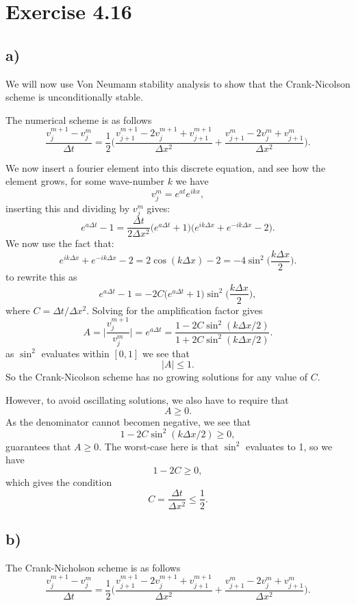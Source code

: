 \documentclass[a4paper, 11pt, notitlepage, english]{article}
\begin{document}
\clearpage

\section*{Exercise 4.16}

\subsection*{a)}
We will now use Von Neumann stability analysis to show that the Crank-Nicolson scheme is unconditionally stable.

The numerical scheme is as follows
$$\frac{v_j^{m+1} - v_j^m}{\Delta t} = \frac{1}{2}\bigg(\frac{v_{j+1}^{m+1} - 2v_j^{m+1} + v_{j+1}^{m+1}}{\Delta x^2} + \frac{v_{j+1}^{m} - 2v_j^{m} + v_{j+1}^{m}}{\Delta x^2} \bigg).$$

We now insert a fourier element into this discrete equation, and see how the element grows, for some wave-number $k$ we have 
$$v_j^m = e^{at}e^{ikx},$$
inserting this and dividing by $v_j^m$ gives:
$$e^{a\Delta t} - 1 = \frac{\Delta t}{2\Delta x^2}\big(e^{a\Delta t}+1\big)\big(e^{ik\Delta x} + e^{-ik\Delta x} - 2\big).$$
We now use the fact that:
$$e^{ik\Delta x} + e^{-ik\Delta x} - 2 = 2\cos(k\Delta x) - 2 = -4\sin^2\bigg(\frac{k\Delta x}{2}\bigg).$$
to rewrite this as
$$e^{a\Delta t} - 1 = -2C\big(e^{a\Delta t} + 1\big) \sin^2\bigg(\frac{k\Delta x}{2}\bigg),$$
where $C=\Delta t / \Delta x^2$. Solving for the amplification factor gives
$$A = \bigg|\frac{v_j^{m+1}}{v_j^m}\bigg| = e^{a\Delta t} = \frac{1 - 2C\sin^2({k\Delta x / 2})}{1 + 2C\sin^2({k\Delta x / 2})}.$$
as $\sin^2$ evaluates within $[0,1]$ we see that
$$|A|\leq 1.$$
So the Crank-Nicolson scheme has no growing solutions for any value of $C$.

However, to avoid oscillating solutions, we also have to require that
$$A \geq 0.$$
As the denominator cannot becomen negative, we see that
$$1 - 2C\sin^2(k\Delta x / 2) \geq 0,$$
guarantees that $A \geq 0$. The worst-case here is that $\sin^2$ evaluates to 1, so we have
$$1 - 2C \geq 0,$$
which gives the condition
$$C = \frac{\Delta t}{\Delta x^2} \leq \frac{1}{2}.$$

\clearpage

\subsection*{b)}
The Crank-Nicholson scheme is as follows
$$\frac{v_j^{m+1} - v_j^m}{\Delta t} = \frac{1}{2}\bigg(\frac{v_{j+1}^{m+1} - 2v_j^{m+1} + v_{j+1}^{m+1}}{\Delta x^2} + \frac{v_{j+1}^{m} - 2v_j^{m} + v_{j+1}^{m}}{\Delta x^2} \bigg).$$
\end{document}
